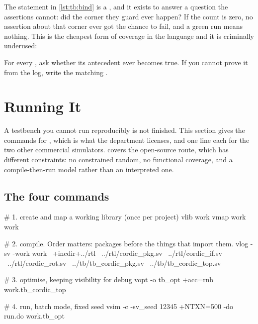 The  statement in \cref{lst:tb:bind}
is a , and it exists to answer a question the assertions
cannot: did the corner they guard ever happen? If the count is zero, no
assertion about that corner ever got the chance to fail, and a green run means
nothing. This is the cheapest form of coverage in the language and it is
criminally underused:


\begin{ruleofthumb}
For every , ask whether its antecedent ever becomes true.
If you cannot prove it from the log, write the matching .
\end{ruleofthumb}

\section{Running It}
\label{sec:tb:run}

A testbench you cannot run reproducibly is not finished. This
section gives the commands for , which is what the department
licenses, and one line each for the two other commercial simulators.
 covers the open-source route, which has different
constraints: no constrained random, no functional coverage, and a compile-then-run
model rather than an interpreted one.

\subsection{The four commands}

\begin{shcode}
# 1. create and map a working library (once per project)
vlib work
vmap work work

# 2. compile.  Order matters: packages before the things that import them.
vlog -sv -work work \
     +incdir+../rtl \
     ../rtl/cordic_pkg.sv \
     ../rtl/cordic_if.sv \
     ../rtl/cordic_rot.sv \
     ../tb/tb_cordic_pkg.sv \
     ../tb/tb_cordic_top.sv

# 3. optimise, keeping visibility for debug
vopt -o tb_opt +acc=rnb work.tb_cordic_top

# 4. run, batch mode, fixed seed
vsim -c -sv_seed 12345 +NTXN=500 -do run.do work.tb_opt
\end{shcode}

